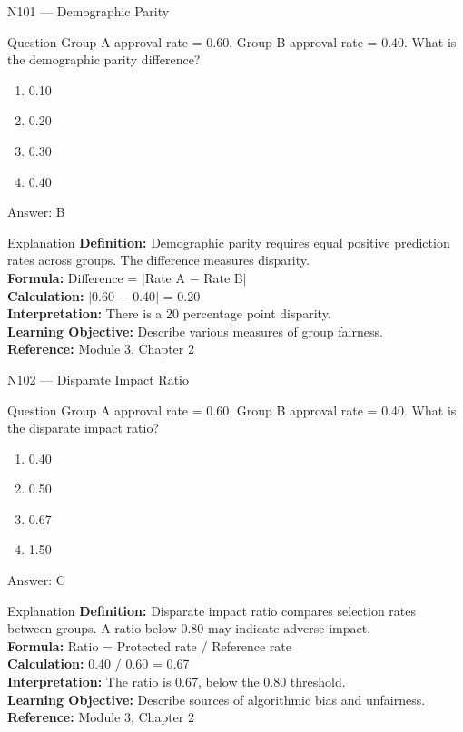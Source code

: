 \documentclass[aspectratio=169,8pt]{beamer}
\begin{document}
	\begin{frame}{N101 --- Demographic Parity}
		\begin{block}{Question}
			Group A approval rate = 0.60. Group B approval rate = 0.40. What is the demographic parity difference?
			\begin{enumerate}
				\item 0.10
				\item 0.20
				\item 0.30
				\item 0.40
			\end{enumerate}
		\end{block}
		\begin{exampleblock}{Answer: B}\end{exampleblock}
		\begin{block}{Explanation}
			\textbf{Definition:} Demographic parity requires equal positive prediction rates across groups. The difference measures disparity.\\
			\textbf{Formula:} Difference = $|$Rate A $-$ Rate B$|$\\
			\textbf{Calculation:} $|$0.60 $-$ 0.40$|$ = 0.20\\
			\textbf{Interpretation:} There is a 20 percentage point disparity.\\
			\textbf{Learning Objective:} Describe various measures of group fairness.\\
			\textbf{Reference:} Module 3, Chapter 2
		\end{block}
	\end{frame}
	
	\begin{frame}{N102 --- Disparate Impact Ratio}
		\begin{block}{Question}
			Group A approval rate = 0.60. Group B approval rate = 0.40. What is the disparate impact ratio?
			\begin{enumerate}
				\item 0.40
				\item 0.50
				\item 0.67
				\item 1.50
			\end{enumerate}
		\end{block}
		\begin{exampleblock}{Answer: C}\end{exampleblock}
		\begin{block}{Explanation}
			\textbf{Definition:} Disparate impact ratio compares selection rates between groups. A ratio below 0.80 may indicate adverse impact.\\
			\textbf{Formula:} Ratio = Protected rate / Reference rate\\
			\textbf{Calculation:} 0.40 / 0.60 = 0.67\\
			\textbf{Interpretation:} The ratio is 0.67, below the 0.80 threshold.\\
			\textbf{Learning Objective:} Describe sources of algorithmic bias and unfairness.\\
			\textbf{Reference:} Module 3, Chapter 2
		\end{block}
	\end{frame}
	
\end{document}

